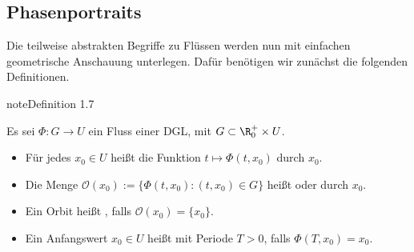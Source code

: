 \documentclass[letterpaper,10pt,english]{jupyterBook}
\begin{document}
\subsection{Phasenportraits}
\label{\detokenize{ode/fluesse:phasenportraits}}
\sphinxAtStartPar
Die teilweise abstrakten Begriffe zu Flüssen werden nun mit einfachen geometrische Anschauung unterlegen. Dafür benötigen wir zunächst die folgenden Definitionen.
\label{ode/fluesse:definition-5}
\begin{sphinxadmonition}{note}{Definition 1.7}



\sphinxAtStartPar
Es sei \(\Phi:G\rightarrow U\) ein Fluss einer DGL, mit \(G\subset \R^+_0\times U\).
\begin{itemize}
\item {} 
\sphinxAtStartPar
Für jedes \(x_0\in U\) heißt die Funktion \(t\mapsto \Phi(t, x_0)\)  durch \(x_0\).

\item {} 
\sphinxAtStartPar
Die Menge \(\mathcal{O}(x_0) := \{\Phi(t, x_0): (t, x_0)\in G\}\) heißt  oder  durch \(x_0\).

\item {} 
\sphinxAtStartPar
Ein Orbit heißt , falls \(\mathcal{O}(x_0) = \{x_0\}\).

\item {} 
\sphinxAtStartPar
Ein Anfangswert \(x_0\in U\) heißt  mit Periode \(T>0\), falls \(\Phi(T, x_0) = x_0\).

\end{itemize}
\end{sphinxadmonition}
\label{ode/fluesse:example-6}
\end{document}

